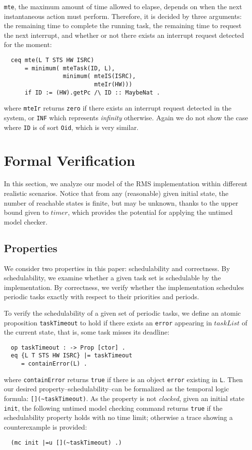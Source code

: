 \documentclass[10pt,journal]{IEEEtran}
\newcommand{\hide}[1]{\ignorespaces}
\begin{document}
\verb|mte|, the maximum amount of time allowed to elapse, depends on
when the next instantaneous action must perform. Therefore, it is
decided by three arguments: the remaining time to complete the running
task, the remaining time to request the next interrupt, and whether or
not there exists an interrupt request detected for the moment:
\begin{verbatim}
  ceq mte(L T STS HW ISRC)
      = minimum( mteTask(ID, L),
                 minimum( mteIS(ISRC), 
                          mteIr(HW)))
      if ID := (HW).getPc /\ ID :: MaybeNat .
\end{verbatim}
where \verb|mteIr| returns \verb|zero| if there exists an interrupt
request detected in the system, or \verb|INF| which represents
\emph{infinity} otherwise. Again we do not show the case where
\verb|ID| is of sort \verb|Oid|, which is very similar. 
\hide{
We should
point out that \verb|mteTask| computes the remaining time to reach the
maximum of the computation requirement of the task, since that is the
time at which a \verb|task-finish| transition \emph{must} happen.
}

\section{Formal Verification}
\label{s:verification}
In this section, we analyze our model of the RMS implementation within
different realistic scenarios.  Notice that from any (reasonable)
given initial state, the number of reachable states is finite, but may
be unknown, thanks to the upper bound given to $timer$, which provides
the potential for applying the untimed model checker.

\subsection{Properties}
We consider two properties in this paper: schedulability and
correctness. By schedulability, we examine whether a given task set is
schedulable by the implementation. By correctness, we verify whether
the implementation schedules periodic tasks exactly with respect to
their priorities and periods.

To verify the schedulability of a given set of periodic tasks, we
define an atomic proposition \verb|taskTimeout| to hold if there
exists an \verb|error| appearing in $taskList$ of the current state,
that is, some task misses its deadline:
\begin{verbatim}
  op taskTimeout : -> Prop [ctor] .
  eq {L T STS HW ISRC} |= taskTimeout 
     = containError(L) .
\end{verbatim}
where \verb|containError| returns \verb|true| if there is an object
\verb|error| existing in \verb|L|. Then our desired
property--schedulability--can be formalized as the temporal logic
formula: \verb|[](~taskTimeout)|. As the property is not
\emph{clocked}, given an initial state \verb|init|, the following
untimed model checking command returns \verb|true| if the
schedulability property holds with no time limit; otherwise a trace
showing a counterexample is provided:
\begin{verbatim}
  (mc init |=u [](~taskTimeout) .)
\end{verbatim}
\end{document}
